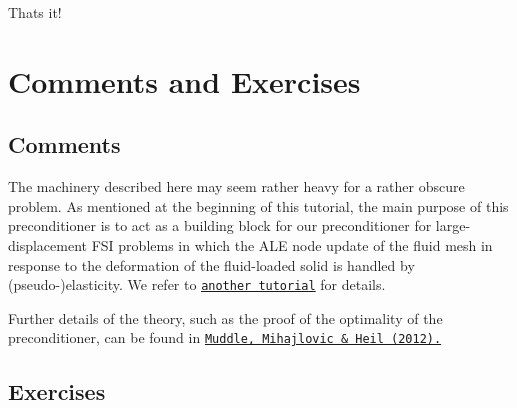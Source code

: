 That\textquotesingle{}s it!



 

\hypertarget{index_comm_and_ex}{}\section{Comments and Exercises}\label{index_comm_and_ex}
\hypertarget{index_comm}{}\subsection{Comments}\label{index_comm}

\begin{DoxyItemize}
\item The machinery described here may seem rather heavy for a rather obscure problem. As mentioned at the beginning of this tutorial, the main purpose of this preconditioner is to act as a building block for our preconditioner for large-\/displacement F\+SI problems in which the A\+LE node update of the fluid mesh in response to the deformation of the fluid-\/loaded solid is handled by (pseudo-\/)elasticity. We refer to \href{../../pseudo_solid_fsi/html/index.html}{\tt another tutorial} for details. ~\newline
~\newline

\item Further details of the theory, such as the proof of the optimality of the preconditioner, can be found in \href{http://dx.doi.org/10.1016/j.jcp.2012.07.001}{\tt Muddle, Mihajlovic \& Heil (2012).}
\end{DoxyItemize}\hypertarget{index_ex}{}\subsection{Exercises}\label{index_ex}

